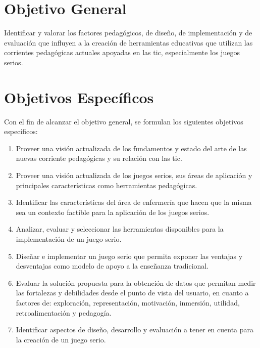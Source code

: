 \section{Objetivo General}
\label{sec:objetivos_generales}

Identificar y valorar los factores pedagógicos, de diseño, de implementación y
de evaluación que influyen a la creación de herramientas educativas que utilizan
las corrientes pedagógicas actuales apoyadas en las \gls{tic}, especialmente 
los juegos serios. 

\section{Objetivos Específicos}

Con el fin de alcanzar el objetivo general, se formulan los siguientes
objetivos específicos:

\begin{enumerate}
   \item Proveer una visión actualizada de los fundamentos y estado del arte de
        las nuevas corriente pedagógicas y su relación con las \Gls{tic}.

    \item Proveer una visión actualizada de los juegos serios, sus áreas de
        aplicación y principales características como herramientas pedagógicas.
    
    \item Identificar las características del área de enfermería que hacen que
        la misma sea un contexto factible para la aplicación de los juegos
        serios.
    
    \item Analizar, evaluar y seleccionar las herramientas disponibles para la
        implementación de un juego serio.
        
    \item Diseñar e implementar un juego serio que permita exponer las ventajas
        y desventajas como modelo de apoyo a la enseñanza tradicional. 
        
    \item Evaluar la solución propuesta para la obtención de datos que permitan
        medir las fortalezas y debilidades desde el punto de vista del usuario,
        en cuanto a factores de: exploración, representación, motivación,
        inmersión, utilidad, retroalimentación y pedagogía.
         
     \item Identificar aspectos de diseño, desarrollo y evaluación a tener en
         cuenta para la creación de un juego serio.
\end{enumerate}
